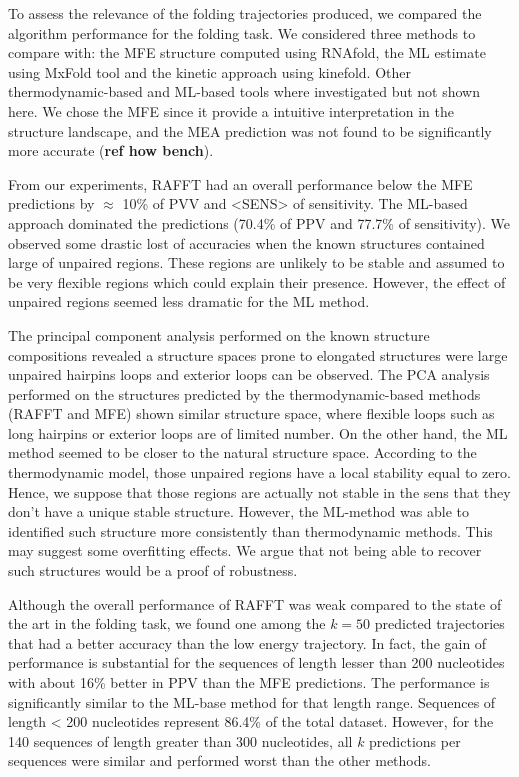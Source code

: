 \documentclass[a4paper,12pt]{article}
\begin{document}
{{To assess the relevance of the folding trajectories produced, we compared the
algorithm performance for the folding task. We considered three methods to
compare with: the MFE structure computed using RNAfold, the ML estimate using
MxFold tool and the kinetic approach using kinefold. Other thermodynamic-based
and ML-based tools where investigated but not shown here. We chose the MFE since
it provide a intuitive interpretation in the structure landscape, and the MEA
prediction was not found to be significantly more accurate (\textbf{ref how bench}).

From our experiments, RAFFT had an overall performance below the MFE predictions
by \(\approx\) 10\% of PVV and <SENS> of sensitivity. The ML-based approach dominated
the predictions (70.4\% of PPV and 77.7\% of sensitivity). We observed some
drastic lost of accuracies when the known structures contained large of unpaired
regions. These regions are unlikely to be stable and assumed to be very flexible
regions which could explain their presence. However, the effect of unpaired
regions seemed less dramatic for the ML method.

The principal component analysis performed on the known structure compositions
revealed a structure spaces prone to elongated structures were large unpaired
hairpins loops and exterior loops can be observed. The PCA analysis performed on
the structures predicted by the thermodynamic-based methods (RAFFT and MFE)
shown similar structure space, where flexible loops such as long hairpins or
exterior loops are of limited number. On the other hand, the ML method seemed to
be closer to the natural structure space. According to the thermodynamic model,
those unpaired regions have a local stability equal to zero. Hence, we suppose
that those regions are actually not stable in the sens that they don't have a
unique stable structure. However, the ML-method was able to identified such
structure more consistently than thermodynamic methods. This may suggest some
overfitting effects. We argue that not being able to recover such structures
would be a proof of robustness.

Although the overall performance of RAFFT was weak compared to the state of the
art in the folding task, we found one among the \(k=50\) predicted trajectories
that had a better accuracy than the low energy trajectory. In fact, the gain of
performance is substantial for the sequences of length lesser than 200
nucleotides with about 16\% better in PPV than the MFE predictions. The
performance is significantly similar to the ML-base method for that length
range. Sequences of length < 200 nucleotides represent 86.4\% of the total
dataset. However, for the 140 sequences of length greater than 300 nucleotides,
all \(k\) predictions per sequences were similar and performed worst than the
other methods.

}}
\end{document}
